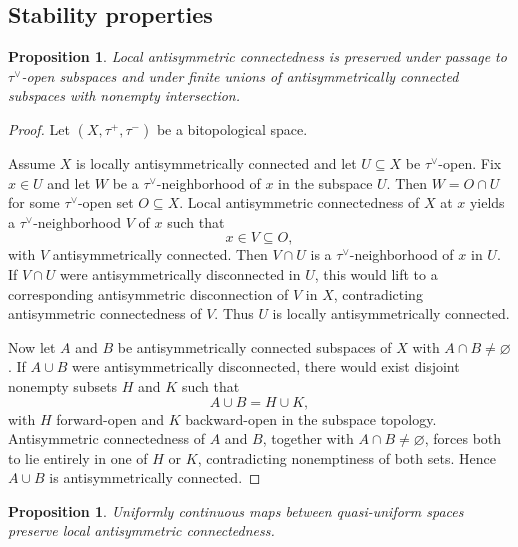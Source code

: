 \documentclass[preprint,12pt]{elsarticle}
\newtheorem{proposition}[theorem]{Proposition}
\begin{document}
\subsection{Stability properties}
\label{ssec:stability}

\begin{proposition}
\label{prop:subspaces-sums}
Local antisymmetric connectedness is preserved under passage to
$\tau^\vee$-open subspaces and under finite unions of antisymmetrically
connected subspaces with nonempty intersection.
\end{proposition}

\begin{proof}
Let $(X,\tau^{+},\tau^{-})$ be a bitopological space.

Assume $X$ is locally antisymmetrically connected and let $U\subseteq X$
be $\tau^\vee$-open.
Fix $x\in U$ and let $W$ be a $\tau^\vee$-neighborhood of $x$ in the
subspace $U$.
Then $W=O\cap U$ for some $\tau^\vee$-open set $O\subseteq X$.
Local antisymmetric connectedness of $X$ at $x$ yields a $\tau^\vee$-neighborhood
$V$ of $x$ such that
\[
x\in V\subseteq O,
\]
with $V$ antisymmetrically connected.
Then $V\cap U$ is a $\tau^\vee$-neighborhood of $x$ in $U$.
If $V\cap U$ were antisymmetrically disconnected in $U$, this would lift
to a corresponding antisymmetric disconnection of $V$ in $X$, contradicting
antisymmetric connectedness of $V$.
Thus $U$ is locally antisymmetrically connected.

Now let $A$ and $B$ be antisymmetrically connected subspaces of $X$ with
$A\cap B\neq\varnothing$.
If $A\cup B$ were antisymmetrically disconnected, there would exist
disjoint nonempty subsets $H$ and $K$ such that
\[
A\cup B = H\cup K,
\]
with $H$ forward-open and $K$ backward-open in the subspace topology.
Antisymmetric connectedness of $A$ and $B$, together with
$A\cap B\neq\varnothing$, forces both to lie entirely in one of $H$ or
$K$, contradicting nonemptiness of both sets.
Hence $A\cup B$ is antisymmetrically connected.
\end{proof}

\begin{proposition}
\label{prop:uniform-images}
Uniformly continuous maps between quasi-uniform spaces preserve local
antisymmetric connectedness.
\end{proposition}
\end{document}

